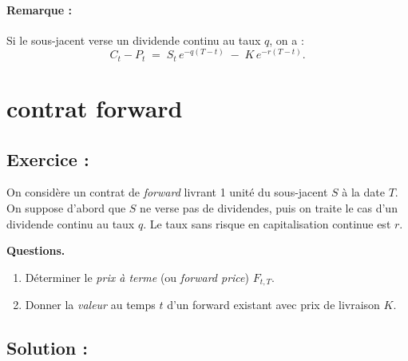 \paragraph{Remarque :}
Si le sous-jacent verse un dividende continu au taux $q$, on a :
\[
C_t - P_t \;=\; S_t\,e^{-q(T-t)} \;-\; K\,e^{-r(T-t)}.
\]


\section{contrat forward}

\subsection*{Exercice : }

\begin{exerciseBox}
On considère un contrat de \emph{forward} livrant 1 unité du sous-jacent $S$ à la date $T$.
On suppose d'abord que $S$ ne verse pas de dividendes, puis on traite le cas d'un
dividende continu au taux $q$. Le taux sans risque en capitalisation continue est $r$.

\medskip
\noindent
\textbf{Questions.}
\begin{enumerate}
  \item Déterminer le \emph{prix à terme} (ou \emph{forward price}) $F_{t,T}$.
  \item Donner la \emph{valeur} au temps $t$ d'un forward existant avec prix de livraison $K$.
\end{enumerate}    
\end{exerciseBox}

\subsection*{Solution :}




